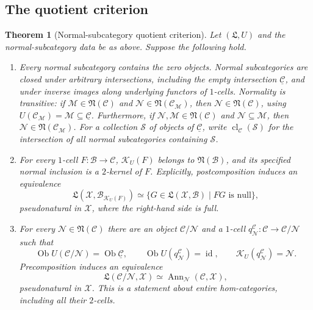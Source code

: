 \documentclass[11pt,reqno,a4paper]{amsart}
\newtheorem{theorem}{Theorem}[section]
\theoremstyle{definition}
\theoremstyle{remark}
\newcommand{\C}{\mathcal{C}}
\newcommand{\M}{\mathcal{M}}
\newcommand{\N}{\mathcal{N}}
\newcommand{\0}{\mathbf{0}}
\renewcommand{\1}{\mathbf{1}}
\newcommand{\Lcat}{\mathfrak L}
\newcommand{\B}{\mathcal B}
\newcommand{\Scl}{\mathcal S}
\newcommand{\X}{\mathcal X}
\DeclareMathOperator{\cl}{cl}
\DeclareMathOperator{\Ann}{Ann}
\begin{document}
\subsection{The quotient criterion}

\begin{theorem}[Normal-subcategory quotient criterion]\label{thm:criterion}
Let $(\Lcat,U)$ and the normal-subcategory data be as above.
Suppose the following hold.
\begin{enumerate}[label=\textup{(Q\arabic*)},leftmargin=16mm]
\item Every normal subcategory contains the zero objects.
Normal subcategories are closed under arbitrary intersections,
including the empty intersection $\underline{\C}$, and under
inverse images along underlying functors of $1$-cells.
Normality is transitive: if
$\M\in\mathfrak{N}(\C)$ and
$\N\in\mathfrak{N}(\C_{\M})$, then
$\N\in\mathfrak{N}(\C)$, using
$U(\C_{\M})=\M\subseteq\underline{\C}$.
Furthermore, if $\N,\M\in\mathfrak{N}(\C)$ and
$\N\subseteq\M$, then
$\N\in\mathfrak{N}(\C_{\M})$.
For a collection $\Scl$ of objects of $\underline{\C}$, write
$\cl_{\C}(\Scl)$ for the intersection of all normal
subcategories containing $\Scl$.

\item For every $1$-cell $F:\B\to\C$,
$\mathcal{K}_U(F)$ belongs to $\mathfrak{N}(\B)$, and its
specified normal inclusion is a $2$-kernel of $F$.
Explicitly, postcomposition induces an equivalence
\[
 \Lcat(\X,\B_{\mathcal{K}_U(F)})
 \simeq
 \{G\in\Lcat(\X,\B)\mid FG\text{ is null}\},
\]
pseudonatural in $\X$, where the right-hand side is full.

\item For every $\N\in\mathfrak{N}(\C)$ there are an object
$\C/\N$ and a $1$-cell $q_{\N}^{\C}:\C\to\C/\N$ such that
\[
 \operatorname{Ob}U(\C/\N)=\operatorname{Ob}\underline{\C},
 \qquad
 \operatorname{Ob}U(q_{\N}^{\C})=\operatorname{id},
 \qquad
 \mathcal{K}_U(q_{\N}^{\C})=\N.
\]
Precomposition induces an equivalence
\begin{equation}\label{eq:normalquotientUP}
 \Lcat(\C/\N,\X)
 \simeq \Ann_{\N}(\C,\X),
\end{equation}
pseudonatural in $\X$. This is a statement about entire
hom-categories, including all their $2$-cells.


\end{enumerate}
\end{theorem}
\end{document}

